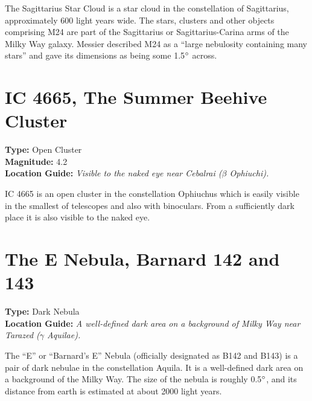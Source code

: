 The Sagittarius Star Cloud is a star cloud in the constellation of
Sagittarius, approximately 600 light years wide. The stars, clusters
and other objects comprising M24 are part of the Sagittarius or
Sagittarius-Carina arms of the Milky Way galaxy. Messier described M24
as a ``large nebulosity containing many stars'' and gave its
dimensions as being some 1.5$\degree$ across.

\section{IC 4665, The Summer Beehive Cluster}
\textbf{Type:} Open Cluster \\
\textbf{Magnitude:} 4.2 \\ 
\textbf{Location Guide:} \textit{Visible to the naked eye near Cebalrai ($\beta$ Ophiuchi).}

IC 4665 is an open cluster in the constellation Ophiuchus which is
easily visible in the smallest of telescopes and also with
binoculars. From a sufficiently dark place it is also visible to the
naked eye.

\section{The E Nebula, Barnard 142 and 143}
\textbf{Type:} Dark Nebula \\
\textbf{Location Guide:} \textit{A well-defined dark area on a background of Milky Way near Tarazed ($\gamma$ Aquilae).}

The ``E'' or ``Barnard's E'' Nebula (officially designated as B142 and
B143) is a pair of dark nebulae in the constellation Aquila. It is a
well-defined dark area on a background of the Milky Way. The size of the
nebula is roughly 0.5$\degree$, and its distance from earth is
estimated at about 2000 light years.

